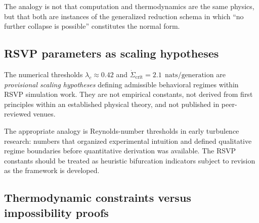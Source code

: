 \documentclass[12pt, a4paper]{article}
\theoremstyle{plain}
\theoremstyle{definition}
\theoremstyle{remark}
\newcommand{\nats}{\;\text{nats}}
\begin{document}
The analogy is not that computation and thermodynamics are the same
physics, but that both are instances of the generalized reduction
schema in which ``no further collapse is possible'' constitutes the
normal form.

\subsection{RSVP parameters as scaling hypotheses}

The numerical thresholds $\lambda_c \approx 0.42$ and
$\dot{\Sigma}_{\mathrm{crit}} = 2.1\,\nats/\mathrm{generation}$
are \emph{provisional scaling hypotheses} defining admissible behavioral
regimes within RSVP simulation work.
They are not empirical constants, not derived from first principles
within an established physical theory, and not published in
peer-reviewed venues.

The appropriate analogy is Reynolds-number thresholds in early
turbulence research: numbers that organized experimental intuition
and defined qualitative regime boundaries before quantitative derivation
was available.
The RSVP constants should be treated as heuristic bifurcation indicators
subject to revision as the framework is developed.

\subsection{Thermodynamic constraints versus impossibility proofs}
\label{sec:foom-caveat}
\end{document}
